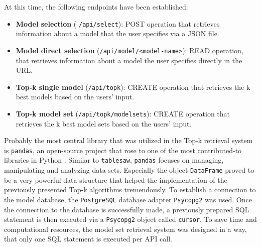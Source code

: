 At this time, the following endpoints have been established:


\begin{itemize}

\item \textbf{Model selection} ( \texttt{/api/select}): POST operation that retrieves information about a model that the user specifies via a JSON file. 
\item \textbf{Model direct selection} (\texttt{/api/model/<model-name>}): READ operation, that retrieves information about a model the user specifies directly in the URL.
\item \textbf{Top-k single model} (\texttt{/api/topk}): CREATE operation that retrieves the k best models based on the users' input.
\item \textbf{Top-k model set} (\texttt{/api/topk/modelsets}): CREATE operation that retrieves the k best model sets based on the users' input.
\end{itemize}


Probably the most central library that was utilized in the Top-k retrieval system is \texttt{pandas}, an open-source project that rose to one of the most contributed-to libraries in Python \cite{mckinney2022}. Similar to \texttt{tablesaw}, \texttt{pandas} focuses on managing, manipulating and analyzing data sets. Especially the object \texttt{DataFrame} proved to be a very powerful data structure that helped the implementation of the previously presented Top-k algorithms tremendously. To establish a connection to the model database, the \texttt{PostgreSQL} database adapter \texttt{Psycopg2} was used. Once the connection to the database is successfully made, a previously prepared SQL statement is then executed via a \texttt{Psycopg2} object called \texttt{cursor}. To save time and computational resources, the model set retrieval system was designed in a way, that only one SQL statement is executed per API call. 

